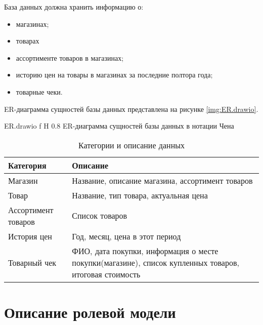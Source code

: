 \documentclass{bmstu}
\begin{document}
База данных должна хранить информацию о:

\begin{itemize}
	\item магазинах;
	\item товарах
	\item ассортименте товаров в магазинах;
	\item историю цен на товары в магазинах за последние полтора года;
	\item товарные чеки.
\end{itemize}

ER-диаграмма сущностей базы данных представлена на рисунке \ref{img:ER.drawio}.

	{ER.drawio}
	{f}
	{H}
	{0.8\textwidth}
	{ER-диаграмма сущностей базы данных в нотации Чена}


\begin{table}[H]
	\caption{Категории и описание данных}
	\begin{center}
		\begin{tabular}{| l | p{11 cm} |} 
			\hline
			
			\textbf{Категория} & \textbf{Описание} \\  
			
			\hline
			
			Магазин & Название, описание магазина, ассортимент товаров \\
			
			\hline
			
			Товар & Название, тип товара, актуальная цена \\
			
			\hline
			
			Ассортимент товаров & Список товаров \\
			
			\hline
			
			История цен & Год, месяц, цена в этот период \\
			
			\hline
			
			Товарный чек & ФИО, дата покупки, информация о месте покупки(магазине), список купленных товаров, итоговая стоимость \\
			\hline
		\end{tabular}
	\end{center}
\end{table}

\section{Описание ролевой модели}
\end{document}
